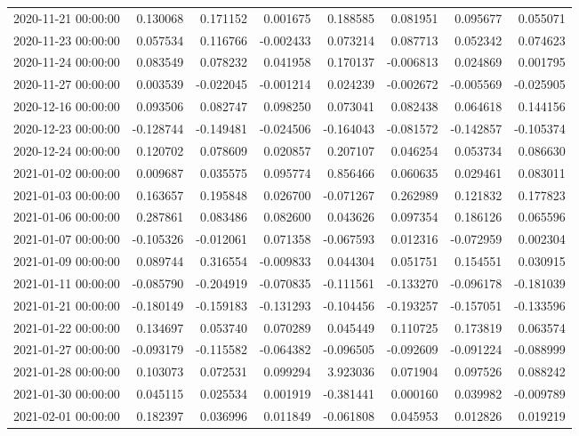 \begin{tabular}{lrrrrrrr}
2020-11-21 00:00:00 & 0.130068 & 0.171152 & 0.001675 & 0.188585 & 0.081951 & 0.095677 & 0.055071 \\
2020-11-23 00:00:00 & 0.057534 & 0.116766 & -0.002433 & 0.073214 & 0.087713 & 0.052342 & 0.074623 \\
2020-11-24 00:00:00 & 0.083549 & 0.078232 & 0.041958 & 0.170137 & -0.006813 & 0.024869 & 0.001795 \\
2020-11-27 00:00:00 & 0.003539 & -0.022045 & -0.001214 & 0.024239 & -0.002672 & -0.005569 & -0.025905 \\
2020-12-16 00:00:00 & 0.093506 & 0.082747 & 0.098250 & 0.073041 & 0.082438 & 0.064618 & 0.144156 \\
2020-12-23 00:00:00 & -0.128744 & -0.149481 & -0.024506 & -0.164043 & -0.081572 & -0.142857 & -0.105374 \\
2020-12-24 00:00:00 & 0.120702 & 0.078609 & 0.020857 & 0.207107 & 0.046254 & 0.053734 & 0.086630 \\
2021-01-02 00:00:00 & 0.009687 & 0.035575 & 0.095774 & 0.856466 & 0.060635 & 0.029461 & 0.083011 \\
2021-01-03 00:00:00 & 0.163657 & 0.195848 & 0.026700 & -0.071267 & 0.262989 & 0.121832 & 0.177823 \\
2021-01-06 00:00:00 & 0.287861 & 0.083486 & 0.082600 & 0.043626 & 0.097354 & 0.186126 & 0.065596 \\
2021-01-07 00:00:00 & -0.105326 & -0.012061 & 0.071358 & -0.067593 & 0.012316 & -0.072959 & 0.002304 \\
2021-01-09 00:00:00 & 0.089744 & 0.316554 & -0.009833 & 0.044304 & 0.051751 & 0.154551 & 0.030915 \\
2021-01-11 00:00:00 & -0.085790 & -0.204919 & -0.070835 & -0.111561 & -0.133270 & -0.096178 & -0.181039 \\
2021-01-21 00:00:00 & -0.180149 & -0.159183 & -0.131293 & -0.104456 & -0.193257 & -0.157051 & -0.133596 \\
2021-01-22 00:00:00 & 0.134697 & 0.053740 & 0.070289 & 0.045449 & 0.110725 & 0.173819 & 0.063574 \\
2021-01-27 00:00:00 & -0.093179 & -0.115582 & -0.064382 & -0.096505 & -0.092609 & -0.091224 & -0.088999 \\
2021-01-28 00:00:00 & 0.103073 & 0.072531 & 0.099294 & 3.923036 & 0.071904 & 0.097526 & 0.088242 \\
2021-01-30 00:00:00 & 0.045115 & 0.025534 & 0.001919 & -0.381441 & 0.000160 & 0.039982 & -0.009789 \\
2021-02-01 00:00:00 & 0.182397 & 0.036996 & 0.011849 & -0.061808 & 0.045953 & 0.012826 & 0.019219 \\

\end{tabular}
